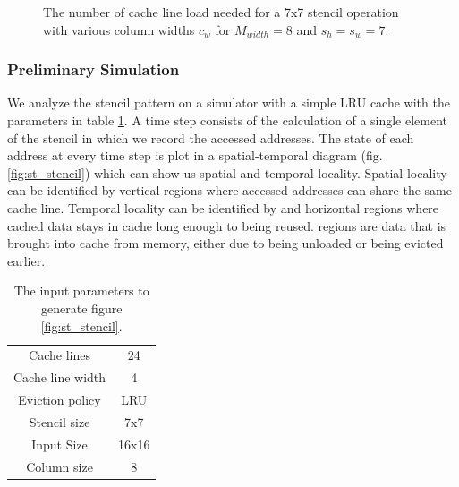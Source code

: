 \documentclass{article}
\begin{document}
\begin{figure}
{
}
\caption{
    The number of cache line load needed for a 7x7 stencil operation with various column widths $c_w$ for $M_{width} = 8$ and $s_h = s_w = 7$.
}
\label{fig:matrix_loads}
\end{figure}

\subsubsection{Preliminary Simulation}
\label{sec:stencil_sim}
We analyze the stencil pattern on a simulator with a simple LRU cache with the parameters in table \ref{tab:sim_stencil_params}. 
A time step consists of the calculation of a single element of the stencil in which we record the accessed addresses.
The state of each address at every time step is plot in a spatial-temporal diagram (fig. \ref{fig:st_stencil}) which can show us spatial and temporal locality.
Spatial locality can be identified by  vertical regions where accessed addresses can share the same cache line.
Temporal locality can be identified by  and  horizontal regions where cached data stays in cache long enough to being reused.  regions are data that is brought into cache from memory, either due to being unloaded or being evicted earlier.

\begin{table}[H]
    \centering
    \begin{tabular}{|c c|}
        \hline
        Cache lines      & 24   \\
        Cache line width & 4    \\
        Eviction policy  & LRU  \\
        \hline
        Stencil size     & 7x7  \\
        Input Size       & 16x16\\
        Column size      & 8    \\
        \hline
    \end{tabular}
    \caption{
        The input parameters to generate figure \ref{fig:st_stencil}.
    }
    \label{tab:sim_stencil_params}
\end{table}
\end{document}
